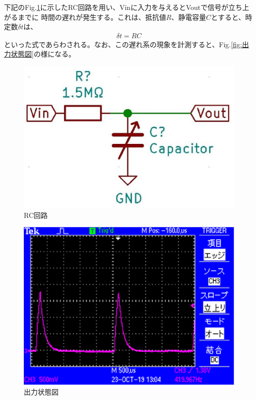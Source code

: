 下記のFig.\ref{fig:RC}に示したRC回路を用い、Vinに入力を与えるとVoutで信号が立ち上がるまでに
時間の遅れが発生する。これは、抵抗値$R$、静電容量$C$とすると、時定数$\delta t$は、
\begin{eqnarray}
    \delta t = RC
\end{eqnarray}
といった式であらわされる。なお、この遅れ系の現象を計測すると、Fig.\ref{fig:出力状態図}の様になる。

\begin{figure}[h]
 \begin{center}
  \includegraphics[width=0.5\columnwidth,clip]{./2_measurement/RC.eps}
  \caption{RC回路}
  \label{fig:RC}
 \end{center}
\end{figure}

\begin{figure}[h]
    \begin{center}
     \includegraphics[width=0.5\columnwidth,clip]{./2_measurement/oscilloscope.eps}
     \caption{出力状態図}
     \label{fing:オシロスコープ}
    \end{center}
\end{figure}

